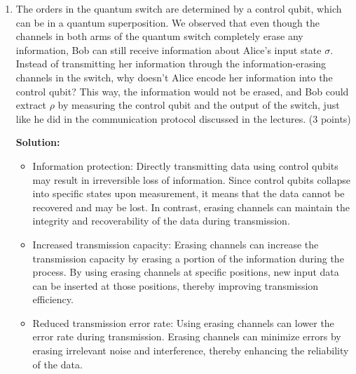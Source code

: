 \documentclass[12pt]{article}
\begin{document}
\begin{enumerate}
    \item The orders in the quantum switch are determined by a control qubit, which can be in a quantum superposition.
    We observed that even though the channels in both arms of the quantum switch completely erase any information, Bob can still receive information about Alice's input state $\sigma$. Instead of transmitting her information through the information-erasing channels in the switch, why doesn't Alice encode her information into the control qubit? This way, the information would not be erased, and Bob could extract $\rho$ by measuring the control qubit and the output of the switch, just like he did in the communication protocol discussed in the lectures. (3 points)
    
    \textbf{Solution:}
    
    \begin{itemize}
        \item Information protection: Directly transmitting data using control qubits may result in irreversible loss of information. Since control qubits collapse into specific states upon measurement, it means that the data cannot be recovered and may be lost. In contrast, erasing channels can maintain the integrity and recoverability of the data during transmission.
        \item Increased transmission capacity: Erasing channels can increase the transmission capacity by erasing a portion of the information during the process. By using erasing channels at specific positions, new input data can be inserted at those positions, thereby improving transmission efficiency.
        \item Reduced transmission error rate: Using erasing channels can lower the error rate during transmission. Erasing channels can minimize errors by erasing irrelevant noise and interference, thereby enhancing the reliability of the data.
    \end{itemize}

        

\end{enumerate}
\end{document}
